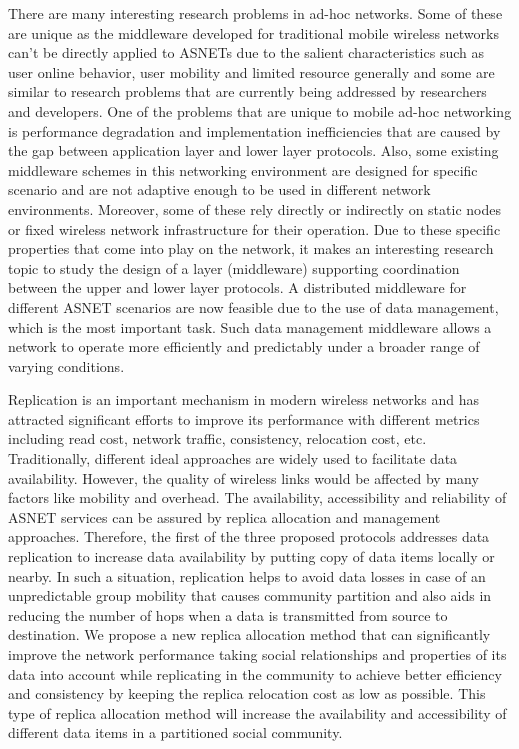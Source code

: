 There are many interesting research problems in ad-hoc networks. Some of these are unique as the middleware developed for traditional mobile wireless networks can't be directly applied to ASNETs due to the salient characteristics such as user online behavior, user mobility and limited resource generally and some are similar to research problems that are currently being addressed by researchers and developers. One of the problems that are unique to mobile ad-hoc networking is performance degradation and implementation inefficiencies that are caused by the gap between application layer and lower layer protocols. Also, some existing middleware schemes in this networking environment are designed for specific scenario and are not adaptive enough to be used in different network environments. Moreover, some of these rely directly or indirectly on static nodes or fixed wireless network infrastructure for their operation. Due to these specific properties that come into play on the network, it makes an interesting research topic to study the design of a layer (middleware) supporting coordination between the upper and lower layer protocols. A distributed middleware for different ASNET scenarios are now feasible due to the use of data management, which is the most important task. Such data management middleware allows a network to operate more efficiently and predictably under a broader range of varying conditions.

Replication is an important mechanism in modern wireless networks and has attracted significant efforts to improve its performance with different metrics including read cost, network traffic, consistency, relocation cost, etc. Traditionally, different ideal approaches are widely used to facilitate data availability. However, the quality of wireless links would be affected by many factors like mobility and overhead. The availability, accessibility and reliability of ASNET services can be assured by replica allocation and management approaches. Therefore, the first of the three proposed protocols addresses data replication to increase data availability by putting copy of data items locally or nearby. In such a situation, replication helps to avoid data losses in case of an unpredictable group mobility that causes community partition and also aids in reducing the number of hops when a data is transmitted from source to destination. We propose a new replica allocation method that can significantly improve the network performance taking social relationships and properties of its data into account while replicating in the community to achieve better efficiency and consistency by keeping the replica relocation cost as low as possible. This type of replica allocation method will increase the availability and accessibility of different data items in a partitioned social community.

